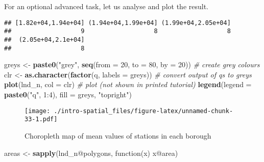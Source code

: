 \documentclass[]{article}
\newenvironment{Shaded}{}{}
\newcommand{\KeywordTok}[1]{\textcolor[rgb]{0.00,0.44,0.13}{\textbf{{#1}}}}
\newcommand{\DataTypeTok}[1]{\textcolor[rgb]{0.56,0.13,0.00}{{#1}}}
\newcommand{\DecValTok}[1]{\textcolor[rgb]{0.25,0.63,0.44}{{#1}}}
\newcommand{\StringTok}[1]{\textcolor[rgb]{0.25,0.44,0.63}{{#1}}}
\newcommand{\CommentTok}[1]{\textcolor[rgb]{0.38,0.63,0.69}{\textit{{#1}}}}
\newcommand{\NormalTok}[1]{{#1}}
\begin{document}
For an optional advanced task, let us analyse and plot the result.

\begin{Shaded}
\end{Shaded}

\begin{verbatim}
## [1.82e+04,1.94e+04] (1.94e+04,1.99e+04] (1.99e+04,2.05e+04] 
##                   9                   8                   8 
##  (2.05e+04,2.1e+04] 
##                   8
\end{verbatim}

\begin{Shaded}
\begin{Highlighting}[]
\NormalTok{greys <-}\StringTok{ }\KeywordTok{paste0}\NormalTok{(}\StringTok{"grey"}\NormalTok{, }\KeywordTok{seq}\NormalTok{(}\DataTypeTok{from =} \DecValTok{20}\NormalTok{, }\DataTypeTok{to =} \DecValTok{80}\NormalTok{, }\DataTypeTok{by =} \DecValTok{20}\NormalTok{)) }\CommentTok{# create grey colours}
\NormalTok{clr <-}\StringTok{ }\KeywordTok{as.character}\NormalTok{(}\KeywordTok{factor}\NormalTok{(q, }\DataTypeTok{labels =} \NormalTok{greys)) }\CommentTok{# convert output of qs to greys}
\KeywordTok{plot}\NormalTok{(lnd_n, }\DataTypeTok{col =} \NormalTok{clr) }\CommentTok{# plot (not shown in printed tutorial)}
\KeywordTok{legend}\NormalTok{(}\DataTypeTok{legend =} \KeywordTok{paste0}\NormalTok{(}\StringTok{"q"}\NormalTok{, }\DecValTok{1}\NormalTok{:}\DecValTok{4}\NormalTok{), }\DataTypeTok{fill =} \NormalTok{greys, }\StringTok{"topright"}\NormalTok{)}
\end{Highlighting}
\end{Shaded}

\begin{figure}[htbp]
\centering
\texttt{[image: ./intro-spatial\_files/figure-latex/unnamed-chunk-33-1.pdf]}
\caption{Choropleth map of mean values of stations in each borough}
\end{figure}

\begin{Shaded}
\begin{Highlighting}[]
\NormalTok{areas <-}\StringTok{ }\KeywordTok{sapply}\NormalTok{(lnd_n@polygons, function(x) x@area)}
\end{Highlighting}
\end{Shaded}
\end{document}
